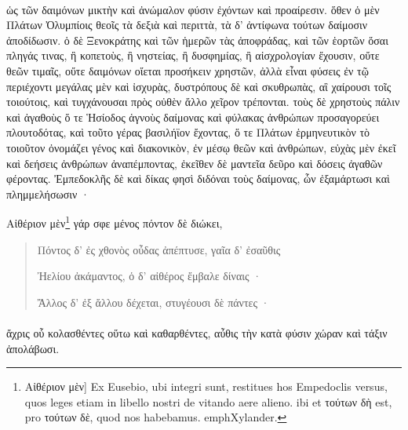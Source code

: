 \documentclass[a4paper, 11pt, oneside, polutonikogreek, german]{article}
\begin{document}
\paragraph{}
ὡς τῶν δαιμόνων μικτὴν καὶ ἀνώμαλον φύσιν ἐχόντων καὶ προαίρεσιν. ὅθεν ὁ μὲν Πλάτων Ὀλυμπίοις θεοῖς τὰ δεξιὰ καὶ περιττὰ, τὰ δ' ἀντίφωνα τούτων δαίμοσιν ἀποδίδωσιν. ὁ δὲ Ξενοκράτης καὶ τῶν ἡμερῶν τὰς ἀποφράδας, καὶ τῶν ἑορτῶν ὅσαι πληγάς τινας, ἢ κοπετοὺς, ἢ νηστείας, ἢ δυσφημίας, ἢ αἰσχρολογίαν ἔχουσιν, οὔτε θεῶν τιμαῖς, οὔτε δαιμόνων οἴεται προσήκειν χρηστῶν, ἀλλὰ εἶναι φύσεις ἐν τῷ περιέχοντι μεγάλας μὲν καὶ ἰσχυρὰς, δυστρόπους δὲ καὶ σκυθρωπὰς, αἳ χαίρουσι τοῖς τοιούτοις, καὶ τυγχάνουσαι πρὸς οὐθὲν ἄλλο χεῖρον τρέπονται. τοὺς δὲ χρηστοὺς πάλιν καὶ ἀγαθοὺς ὅ τε Ἡσίοδος ἁγνοὺς δαίμονας καὶ φύλακας ἀνθρώπων προσαγορεύει πλουτοδότας, καὶ τοῦτο γέρας βασιλήϊον ἔχοντας, ὅ τε Πλάτων ἑρμηνευτικὸν τὸ τοιοῦτον ὀνομάζει γένος καὶ διακονικὸν, ἐν μέσῳ θεῶν καὶ ἀνθρώπων, εὐχὰς μὲν ἐκεῖ καὶ δεήσεις ἀνθρώπων ἀναπέμποντας, ἐκεῖθεν δὲ μαντεῖα δεῦρο καὶ δόσεις ἀγαθῶν φέροντας. Ἐμπεδοκλῆς δὲ καὶ δίκας φησὶ διδόναι τοὺς δαίμονας, ὧν ἐξαμάρτωσι καὶ πλημμελήσωσιν ·

Αἰθέριον μὲν\footnote{Αἰθέριον μὲν] Ex Eusebio, ubi integri sunt, restitues hos Empedoclis versus, quos leges etiam in libello nostri de vitando aere alieno. ibi et τούτων δὴ est, pro τούτων δὲ, quod nos habebamus. emph{Xylander.}} γάρ σφε μένος πόντον δὲ διώκει,
\begin{quotation}
Πόντος δ' ἐς χθονὸς οὖδας ἀπέπτυσε, γαῖα δ' ἐσαῦθις

Ἠελίου ἀκάμαντος, ὁ δ' αἰθέρος ἔμβαλε δίναις ·

Ἄλλος δ' ἐξ ἄλλου δέχεται, στυγέουσι δὲ πάντες ·
\end{quotation}
\paragraph{}
ἄχρις οὗ κολασθέντες οὕτω καὶ καθαρθέντες, αὖθις τὴν κατὰ φύσιν χώραν καὶ τάξιν ἀπολάβωσι.
\end{document}
